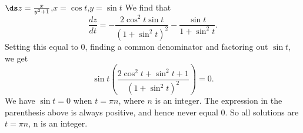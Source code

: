 {$\ds z=\frac{x}{y^2+1}$,\qquad $x=\cos t$,\qquad $y=\sin t$
}
{We find that $$\frac{dz}{dt} = -\frac{2\cos^2t\sin t}{(1+\sin^2t)^2}-\frac{\sin t}{1+\sin^2t}.$$
Setting this equal to 0, finding a common denominator and factoring out $\sin t$, we get
$$\sin t\left(\frac{2\cos^2t+\sin^2t+1}{(1+\sin^2t)^2}\right)=0.$$
We have $\sin t= 0$ when $t = \pi n$, where $n$ is an integer. The expression in the parenthesis above is always positive, and hence never equal 0. So all solutions are 
$t=\pi n$, n is an integer.
}
